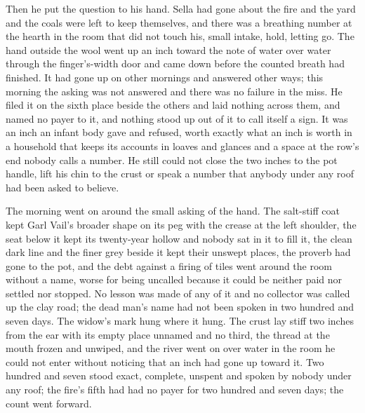 Then he put the question to his hand. Sella had gone about the fire and the yard and the coals were left to keep themselves, and there was a breathing number at the hearth in the room that did not touch his, small intake, hold, letting go. The hand outside the wool went up an inch toward the note of water over water through the finger's-width door and came down before the counted breath had finished. It had gone up on other mornings and answered other ways; this morning the asking was not answered and there was no failure in the miss. He filed it on the sixth place beside the others and laid nothing across them, and named no payer to it, and nothing stood up out of it to call itself a sign. It was an inch an infant body gave and refused, worth exactly what an inch is worth in a household that keeps its accounts in loaves and glances and a space at the row's end nobody calls a number. He still could not close the two inches to the pot handle, lift his chin to the crust or speak a number that anybody under any roof had been asked to believe.

The morning went on around the small asking of the hand. The salt-stiff coat kept Garl Vail's broader shape on its peg with the crease at the left shoulder, the seat below it kept its twenty-year hollow and nobody sat in it to fill it, the clean dark line and the finer grey beside it kept their unswept places, the proverb had gone to the pot, and the debt against a firing of tiles went around the room without a name, worse for being uncalled because it could be neither paid nor settled nor stopped. No lesson was made of any of it and no collector was called up the clay road; the dead man's name had not been spoken in two hundred and seven days. The widow's mark hung where it hung. The crust lay stiff two inches from the ear with its empty place unnamed and no third, the thread at the mouth frozen and unwiped, and the river went on over water in the room he could not enter without noticing that an inch had gone up toward it. Two hundred and seven stood exact, complete, unspent and spoken by nobody under any roof; the fire's fifth had had no payer for two hundred and seven days; the count went forward.
